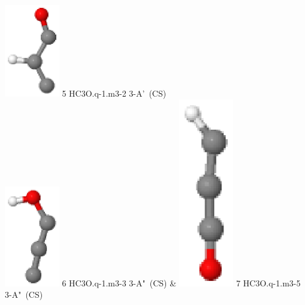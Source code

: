\documentclass[10pt]{article}
\begin{document}
\begin{tabular}
\includegraphics[width=2.40000000000000000000cm]{HC3O.q-1.m3-2.eps} \tiny{5 \hspace{1.20000000000000000000cm} HC3O.q-1.m3-2 \hspace{5pt} 3-A'~(CS)} 
\\\hline
\includegraphics[width=2.40000000000000000000cm]{HC3O.q-1.m3-3.eps} \tiny{6 \hspace{1.20000000000000000000cm} HC3O.q-1.m3-3 \hspace{5pt} 3-A"~(CS)} &
\includegraphics[width=2.40000000000000000000cm]{HC3O.q-1.m3-5.eps} \tiny{7 \hspace{1.20000000000000000000cm} HC3O.q-1.m3-5 \hspace{5pt} 3-A"~(CS)} 
\\
\end{tabular}
\end{document}
